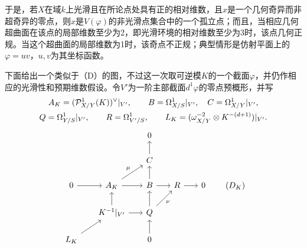 于是，若$X$在域$k$上光滑且在所论点处具有正的相对维数，且$x$是一个几何奇异而非超奇异的零点，则$x$是$V(\varphi)$的非光滑点集合中的一个孤立点；而且，当相应几何超曲面在该点的局部维数至少为2，即光滑环境的相对维数至少为3时，该点几何正规。当这个超曲面的局部维数为1时，该奇点不正规；典型情形是仿射平面上的$\varphi=uv$，$u,v$为其坐标函数。

下面给出一个类似于（D）的图，不过这一次取可逆模$K$的一个截面$\varphi$，并仍作相应的光滑性和预期维数假设。令$V'$为一阶主部截面$d^1\varphi$的零点预概形，并写
\begin{gather*}
 A_K=(\mathcal P^1_{X/Y}(K))^\vee|_{V'},\qquad
 B=\Omega^1_{X/S}|_{V'},\quad C=\Omega^1_{X/Y}|_{V'},\\
 Q=\Omega^1_{Y/S}|_{V'},\qquad R=\Omega^1_{V'/S},\qquad
 L_K=(\omega_{X/Y}^{-2}\otimes K^{-(d+1)})|_{V'}.
\end{gather*}
\[
\begin{tikzcd}[row sep=1.6em,column sep=1.7em]
 &&0\\
 &&C\arrow[u]\\
 0\arrow[r]&A_K\arrow[r]\arrow[ur,"\mu"]&B\arrow[u]\arrow[r]&R\arrow[r]&0\\
 &K^{-1}|_{V'}\arrow[u]\arrow[r]&Q\arrow[u]\arrow[ur,"\nu"']\\
 L_K\arrow[ur]&&0\arrow[u]
\end{tikzcd}\tag{$D_K$}
\]

\endgroup
